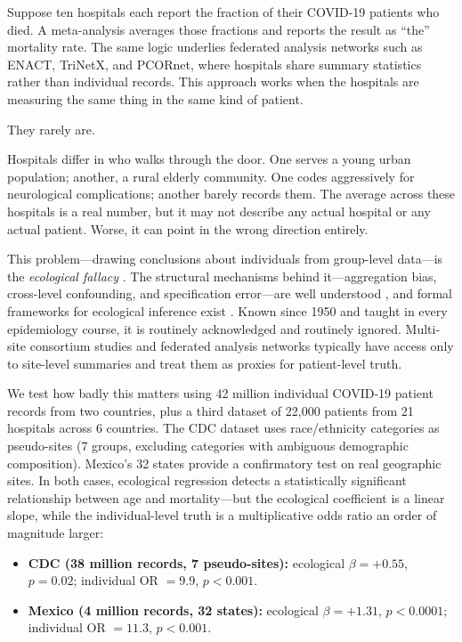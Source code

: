 \documentclass[11pt]{article}
\begin{document}
Suppose ten hospitals each report the fraction of their COVID-19 patients who
died.  A meta-analysis averages those fractions and reports the result as
``the'' mortality rate.  The same logic underlies federated analysis
networks such as ENACT, TriNetX, and PCORnet, where hospitals share summary
statistics rather than individual records.  This approach works when the
hospitals are measuring the same thing in the same kind of patient.

They rarely are.

Hospitals differ in who walks through the door.  One serves a young urban
population; another, a rural elderly community.  One codes aggressively for
neurological complications; another barely records them.  The average across
these hospitals is a real number, but it may not describe any actual hospital
or any actual patient.  Worse, it can point in the wrong direction entirely.

This problem---drawing conclusions about individuals from group-level
data---is the \emph{ecological fallacy}
\cite{robinson1950ecological}.  The structural mechanisms behind it---aggregation
bias, cross-level confounding, and specification error---are well understood
\cite{greenland1992ecological,greenland2001ecologic}, and formal frameworks
for ecological inference exist \cite{king1997ecological,wakefield2003ecological,wakefield2008ecologic}.
Known since 1950 and taught in every
epidemiology course, it is routinely acknowledged and routinely ignored.
Multi-site consortium studies and federated analysis networks typically have
access only to site-level summaries and treat them as proxies for
patient-level truth.

We test how badly this matters using 42 million individual COVID-19 patient
records from two countries, plus a third dataset of 22,000 patients from 21
hospitals across 6 countries.  The CDC dataset uses race/ethnicity categories
as pseudo-sites (7 groups, excluding categories with ambiguous demographic
composition).  Mexico's 32 states provide a confirmatory test on real
geographic sites.  In both cases, ecological regression detects a
statistically significant relationship between age and mortality---but the
ecological coefficient is a linear slope, while the individual-level truth
is a multiplicative odds ratio an order of magnitude larger:

\begin{itemize}
\item \textbf{CDC (38 million records, 7 pseudo-sites):} ecological
$\beta = +0.55$, $p = 0.02$; individual OR $= 9.9$, $p < 0.001$.

\item \textbf{Mexico (4 million records, 32 states):} ecological
$\beta = +1.31$, $p < 0.0001$; individual OR $= 11.3$, $p < 0.001$.
\end{itemize}
\end{document}
